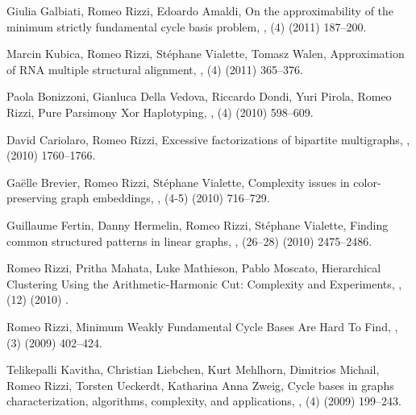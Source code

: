 \begin{etaremune}
  \item {\sc Giulia Galbiati, Romeo Rizzi, Edoardo Amaldi},
   \newblock  On the approximability of the minimum strictly fundamental cycle basis problem,
   ,
   (4) (2011) 187--200.

  \item {Marcin Kubica, Romeo Rizzi, St\'ephane Vialette, Tomasz Walen},
   \newblock Approximation of RNA multiple structural alignment,
   ,
   (4) (2011) 365--376.

  \item {\sc Paola Bonizzoni, Gianluca Della Vedova, Riccardo Dondi, Yuri Pirola, Romeo Rizzi},
   \newblock  Pure Parsimony Xor Haplotyping,
   ,
   (4) (2010) 598--609.

  \item {\sc David Cariolaro, Romeo Rizzi},
   \newblock  Excessive factorizations of bipartite multigraphs,
   ,
    (2010) 1760--1766.

  \item {\sc Ga\"elle Brevier, Romeo Rizzi, St\'ephane Vialette},
   \newblock   Complexity issues in color-preserving graph embeddings,
   ,
   (4-5) (2010) 716--729.

  \item {\sc Guillaume Fertin, Danny Hermelin, Romeo Rizzi, St\'ephane Vialette},
   \newblock  Finding common structured patterns in linear graphs,
   ,
   (26--28) (2010) 2475--2486.

  \item {\sc Romeo Rizzi, Pritha Mahata, Luke Mathieson, Pablo Moscato},
   \newblock  Hierarchical Clustering Using the Arithmetic-Harmonic Cut: Complexity and Experiments,
   ,
   (12) (2010) .

  \item {\sc Romeo Rizzi},
   \newblock   Minimum Weakly Fundamental Cycle Bases Are Hard To Find,
   ,
   (3) (2009) 402--424.

  \item {\sc Telikepalli Kavitha, Christian Liebchen, Kurt Mehlhorn, Dimitrios Michail, Romeo Rizzi, Torsten Ueckerdt, Katharina Anna Zweig},
   \newblock  Cycle bases in graphs characterization, algorithms, complexity, and applications,
   ,
   (4) (2009) 199--243.


\end{etaremune}
